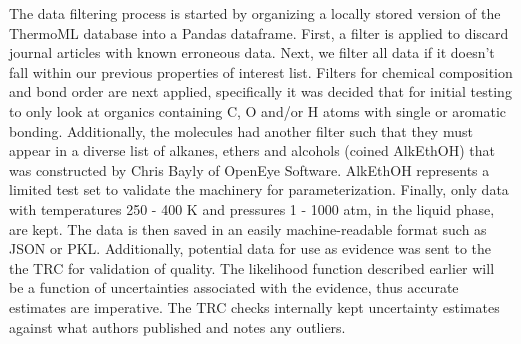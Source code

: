 \documentclass[rmp,nofootinbib,superscriptaddress,12pt,tightenlines,notitlepage]{revtex4-1}
\begin{document}
The data filtering process is started by organizing a locally stored version of the 
ThermoML database into a Pandas dataframe. First, a filter is applied to discard journal articles with known erroneous data. Next, we filter all data if it doesn't 
fall within our previous properties of interest list. Filters for chemical composition and bond order are next applied, specifically it was decided that for initial 
testing to only look at organics containing C, O and/or H atoms with single or aromatic bonding. Additionally, the molecules had another filter such that they must appear
in a diverse list of alkanes, ethers and alcohols (coined AlkEthOH) that was constructed by Chris Bayly of OpenEye Software. AlkEthOH represents a limited test set
to validate the machinery for parameterization. Finally, only data with temperatures  
250 - 400 K and pressures 1 - 1000 atm, in the liquid phase, are kept. The data is then saved in an easily machine-readable format such as JSON or PKL. Additionally, potential data 
for use as evidence was sent to the the TRC for validation of quality. The likelihood function described earlier will be a function of uncertainties associated
with the evidence, thus accurate estimates are imperative. The TRC checks internally kept uncertainty estimates against what authors published and notes any outliers. 
\end{document}
